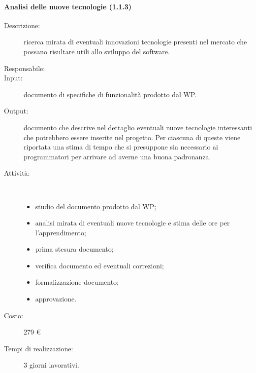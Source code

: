 \begin{description}
\paragraph{Analisi delle nuove tecnologie (1.1.3)}
\begin{description}
\item[Descrizione:] ricerca mirata di eventuali innovazioni tecnologie presenti nel mercato che possano risultare utili allo sviluppo del software.
\item[Responsabile:]
\item[Input:] documento di specifiche di funzionalit\`{a} prodotto dal WP.
\item[Output:] documento che descrive nel dettaglio eventuali nuove tecnologie interessanti che potrebbero essere inserite nel progetto. Per ciascuna di queste viene riportata una stima di tempo che si presuppone sia necessario ai programmatori per arrivare ad averne una buona padronanza.
\item[Attività:]\mbox{}\\[-1.5\baselineskip]
	\begin{itemize}
	\item studio del documento prodotto dal WP;
	\item analisi mirata di eventuali nuove tecnologie e stima delle ore per l'apprendimento;
	\item prima stesura documento;
	\item verifica documento ed eventuali correzioni;
	\item formalizzazione documento;
	\item approvazione.
	\end{itemize}
\item[Costo:] 279 \euro{}
\item[Tempi di realizzazione:] 3 giorni lavorativi.
\end{description}


\end{description}

